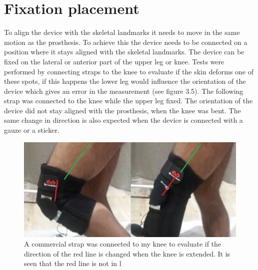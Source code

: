 \documentclass[whitelogo]{tudelft-report}
\begin{document}
{{{\section{Fixation placement}
To align the device with the skeletal landmarks it needs to move in the same motion as the prosthesis. To achieve this the device needs to be connected on a position where it stays aligned with the skeletal landmarks. The device can be fixed on the lateral or anterior part of the upper leg or knee. Tests were performed by connecting straps to the knee to evaluate if the skin deforms one of these spots, if this happens the lower leg would influence the orientation of the device which gives an error in the measurement (see figure 3.5). The following strap was connected to the knee while the upper leg fixed. The orientation of the device did not stay aligned with the prosthesis, when the knee was bent. The same change in direction is also expected when the device is connected with a gauze or a sticker.
\begin{figure}[!htb]
	\centering\includegraphics[width=450pt]{orientation_knee_device2.jpg}
	\caption{A commercial strap was connected to my knee to evaluate if the direction of the red line is changed when the knee is extended. It is seen that the red line is not in l}
\end{figure}

}}}
\end{document}

